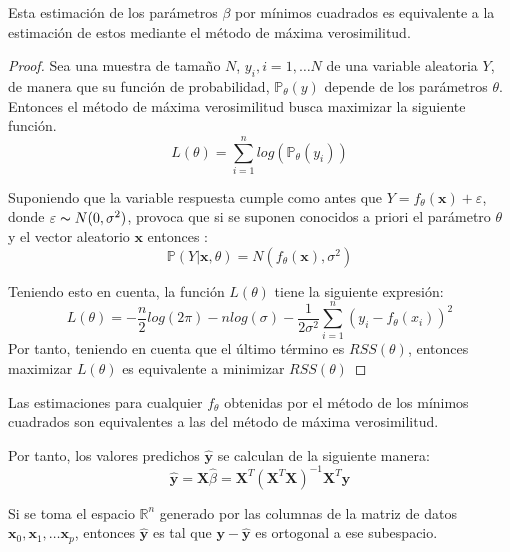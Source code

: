 \begin{propo}
Esta estimación de los parámetros $\beta$ por mínimos cuadrados es equivalente a la estimación de estos mediante el método de máxima verosimilitud.
\begin{proof}
Sea una muestra de tamaño $N$, $y_i, i=1,\ldots N$ de una variable aleatoria $Y$, de manera que su función de probabilidad, $\mathbb{P}_\theta(y)$ depende de los parámetros $\theta$. Entonces el método de máxima verosimilitud busca maximizar la siguiente función.
\begin{equation}
L(\theta)=\sum_{i=1}^n log( \mathbb{P}_{\theta}(y_i))
\end{equation}

\noindent Suponiendo que la variable respuesta cumple como antes que  $Y=f_\theta (\textbf{x})+\varepsilon$, donde $\varepsilon \thicksim N(0,\sigma^2)$, provoca que si se suponen conocidos a priori el parámetro $\theta$ y el vector aleatorio $\textbf{x}$ entonces :
\begin{equation}
\mathbb{P}(Y|\textbf{x},\theta)=N(f_\theta(\textbf{x}), \sigma^2)
\end{equation}

\noindent Teniendo esto en cuenta, la función $L(\theta)$ tiene la siguiente expresión:
\begin{equation}
L(\theta)=-\dfrac{n}{2}log(2\pi)-n log(\sigma)-\dfrac{1}{2\sigma^2}\sum_{i=1}^n (y_i-f_\theta (x_i))^2
\end{equation}
Por tanto, teniendo en cuenta que el último término es $RSS(\theta)$, entonces maximizar $L(\theta)$ es equivalente a minimizar $RSS(\theta)$
\end{proof}
\end{propo}
\begin{coro}
Las estimaciones para cualquier $f_{\theta}$ obtenidas por el método de los mínimos cuadrados son equivalentes a las del método de máxima verosimilitud.  
\end{coro}
\noindent Por tanto, los valores predichos $\hat{\textbf{y}}$ se calculan de la siguiente manera:
\begin{equation}
\hat{\textbf{y}}=\textbf{X}\hat{\beta}=\textbf{X}^T(\textbf{X}^T\textbf{X})^{-1}\textbf{X}^T\textbf{y}
\end{equation}

\noindent Si se toma el espacio $\mathbb{R}^n$ generado por las columnas de la matriz de datos $\textbf{x}_0,\textbf{x}_1,\ldots \textbf{x}_p$, entonces $\hat{\textbf{y}}$ es tal que $\textbf{y}-\hat{\textbf{y}}$ es ortogonal a ese subespacio. 

